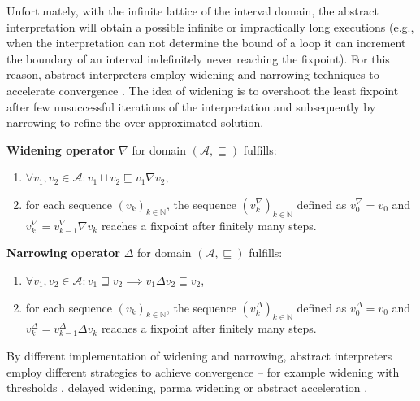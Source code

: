 Unfortunately, with the infinite lattice of the interval
domain, the
abstract interpretation will obtain a possible infinite or impractically long
executions (e.g., when the interpretation can not determine the bound of a loop
it can increment the boundary of an interval indefinitely never reaching the
fixpoint). For this reason, abstract interpreters employ widening and
narrowing techniques to accelerate convergence \cite{Cousot1992a, Cortesi2011}.
The idea of wi\-de\-ning is to overshoot the least fixpoint after few
unsuccessful iterations of the interpretation and subsequently by narrowing to
refine the over-approximated solution.
\begin{definition}
    \textbf{Widening operator} $\nabla$ for domain $(\mathcal{A},
    \sqsubseteq)$ fulfills:
    \begin{enumerate}
        \item $\forall v_1, v_2 \in \mathcal{A} : v_1 \sqcup v_2 \sqsubseteq v_1 \nabla v_2$,
        \item for each sequence $(v_k)_{k \in \mathbb{N}}$, the sequence $(v^{\nabla}_k)_{k \in \mathbb{N}}$ defined as $v^{\nabla}_0 = v_0$ and $v^{\nabla}_k = v^{\nabla}_{k-1} \nabla v_k$ reaches a fixpoint after finitely many steps.
    \end{enumerate}
\end{definition}
\begin{definition}
    \textbf{Narrowing operator} $\Delta$ for domain $(\mathcal{A},
    \sqsubseteq)$ fulfills:
    \begin{enumerate}
        \item $\forall v_1, v_2 \in \mathcal{A} : v_1 \sqsupseteq v_2 \implies v_1 \Delta v_2 \sqsubseteq v_2$,
        \item for each sequence $(v_k)_{k \in \mathbb{N}}$, the sequence $(v^{\Delta}_k)_{k \in \mathbb{N}}$ defined as $v^{\Delta}_0 = v_0$ and $v^{\Delta}_k = v^{\Delta}_{k-1} \Delta v_k$ reaches a fixpoint after finitely many steps.
    \end{enumerate}
\end{definition}

By different implementation of widening and narrowing, abstract interpreters
employ different strategies to achieve convergence -- for example widening
with thresholds \cite{Blanchet2003, Lakhdar2011}, delayed widening, parma widening
\cite{Bagnara2008} or abstract acceleration \cite{Gonnord2006, Feautrier2010}.

